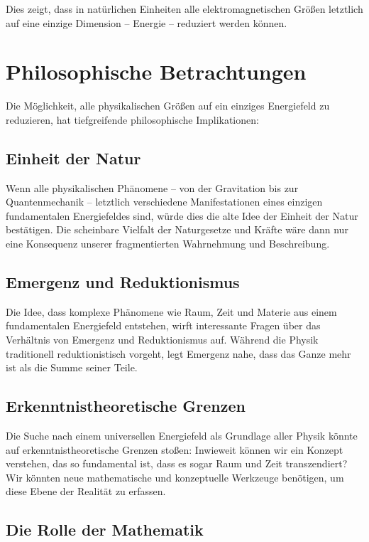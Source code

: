 \documentclass{article}
\begin{document}
	Dies zeigt, dass in natürlichen Einheiten alle elektromagnetischen Größen letztlich auf eine einzige Dimension – Energie – reduziert werden können.
	
	\section{Philosophische Betrachtungen}
	
	Die Möglichkeit, alle physikalischen Größen auf ein einziges Energiefeld zu reduzieren, hat tiefgreifende philosophische Implikationen:
	
	\subsection{Einheit der Natur}
	
	Wenn alle physikalischen Phänomene – von der Gravitation bis zur Quantenmechanik – letztlich verschiedene Manifestationen eines einzigen fundamentalen Energiefeldes sind, würde dies die alte Idee der Einheit der Natur bestätigen. Die scheinbare Vielfalt der Naturgesetze und Kräfte wäre dann nur eine Konsequenz unserer fragmentierten Wahrnehmung und Beschreibung.
	
	\subsection{Emergenz und Reduktionismus}
	
	Die Idee, dass komplexe Phänomene wie Raum, Zeit und Materie aus einem fundamentalen Energiefeld entstehen, wirft interessante Fragen über das Verhältnis von Emergenz und Reduktionismus auf. Während die Physik traditionell reduktionistisch vorgeht, legt Emergenz nahe, dass das Ganze mehr ist als die Summe seiner Teile.
	
	\subsection{Erkenntnistheoretische Grenzen}
	
	Die Suche nach einem universellen Energiefeld als Grundlage aller Physik könnte auf erkenntnistheoretische Grenzen stoßen: Inwieweit können wir ein Konzept verstehen, das so fundamental ist, dass es sogar Raum und Zeit transzendiert? Wir könnten neue mathematische und konzeptuelle Werkzeuge benötigen, um diese Ebene der Realität zu erfassen.
	
	\subsection{Die Rolle der Mathematik}
	
\end{document}
